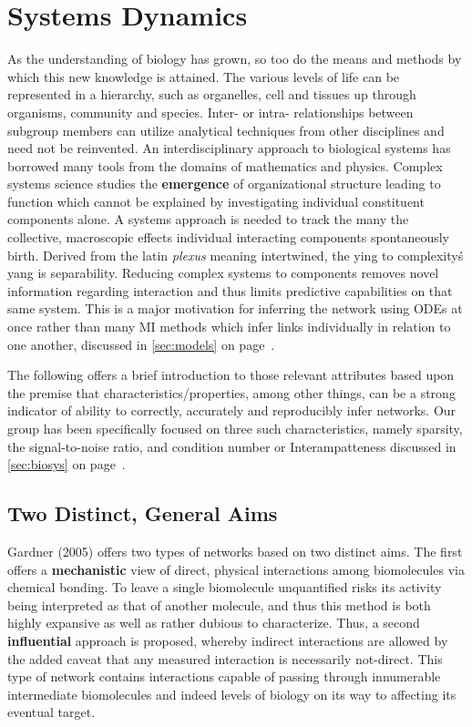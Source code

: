 
\section{Systems Dynamics}
\label{sec:sysdyn}
As the understanding of biology has grown, so too do the means and methods by which this new knowledge is attained. The various levels of life can be represented in a hierarchy, such as organelles, cell and tissues up through organisms, community and species. Inter- or intra- relationships between subgroup members can utilize analytical techniques from other disciplines and need not be reinvented. An interdisciplinary approach to biological systems has borrowed many tools from the domains of mathematics and physics. Complex systems science studies the \textbf{emergence} of organizational structure leading to function which cannot be explained by investigating individual constituent components alone. A systems approach is needed to track the many the collective, macroscopic effects individual interacting components spontaneously birth. Derived from the latin \emph{plexus} meaning intertwined, the ying to complexity\'s yang is separability. Reducing complex systems to components removes novel information regarding interaction and thus limits predictive capabilities on that same system. This is a major motivation for inferring the network using ODEs at once rather than many MI methods which infer links individually in relation to one another, discussed in \cref{sec:models} on page~\pageref{sec:models}.

The following offers a brief introduction to those relevant attributes based upon the premise that characteristics/properties, among other things, can be a strong indicator of ability to correctly, accurately and reproducibly infer networks. Our group has been specifically focused on three such characteristics, namely sparsity, the signal-to-noise ratio, and condition number or Interampatteness discussed in \cref{sec:biosys} on page~\pageref{sec:biosys}.


\subsection{Two Distinct, General Aims}
\label{sec:purpose}
Gardner (2005) offers two types of networks based on two distinct aims. The first offers a \textbf{mechanistic} view of direct, physical interactions among biomolecules via chemical bonding. To leave a single biomolecule unquantified risks its activity being interpreted as that of another molecule, and thus this method is both highly expansive as well as rather dubious to characterize. Thus, a second \textbf{influential} approach is proposed, whereby indirect interactions are allowed by the added caveat that any measured interaction is necessarily not-direct. This type of network contains interactions capable of passing through innumerable intermediate biomolecules and indeed levels of biology on its way to affecting its eventual target.


